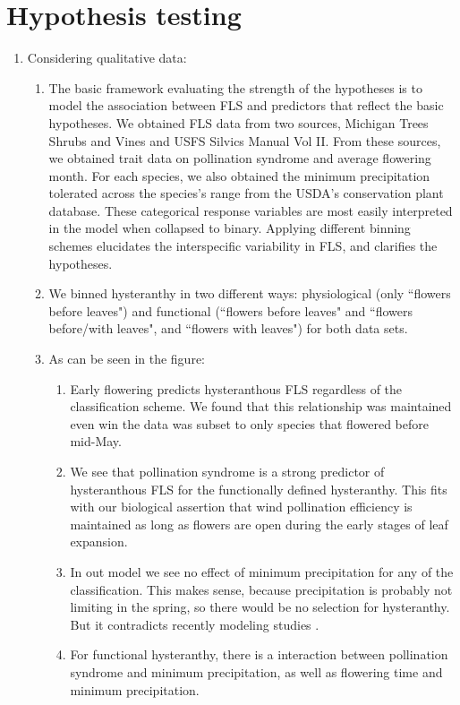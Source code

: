 \documentclass{article}
\begin{document}
\section{Hypothesis testing}
\begin{enumerate}
    \item Considering qualitative data:
    \begin{enumerate}
    \item The basic framework evaluating the strength of the hypotheses is to model the association between FLS and predictors that reflect the basic hypotheses. We obtained FLS data from two sources, Michigan Trees Shrubs and Vines and USFS Silvics Manual Vol II. From these sources, we obtained trait data on pollination syndrome and average flowering month. For each species, we also obtained the minimum precipitation tolerated across the species's range from the USDA's conservation plant database. These categorical response variables are most easily interpreted in the model when collapsed to binary.  Applying different binning schemes elucidates the interspecific variability in FLS, and clarifies the hypotheses. 
       \item We binned hysteranthy in two different ways: physiological (only ``flowers before leaves") and functional (``flowers before leaves" and ``flowers before/with leaves", and ``flowers with leaves") for both data sets. 
    \item As can be seen in the figure: 
    \begin{enumerate}
        \item  Early flowering predicts hysteranthous FLS regardless of the classification scheme. We found that this relationship was maintained even win the data was subset to only species that flowered before mid-May.
        \item We see that pollination syndrome is a strong predictor of hysteranthous FLS for the functionally defined hysteranthy. This fits with our biological assertion that wind pollination efficiency is maintained as long as flowers are open during the early stages of leaf expansion.
        \item In out model we see no effect of minimum precipitation for any of the classification. This makes sense, because precipitation is probably not limiting in the spring, so there would be no selection for hysteranthy. But it contradicts recently modeling studies \citep{Gougherty2018}.
        \item For functional hysteranthy, there is a interaction between pollination syndrome and minimum precipitation,  as well as flowering time and minimum precipitation.

\end{enumerate}
\end{enumerate}
\end{enumerate}
\end{document}
